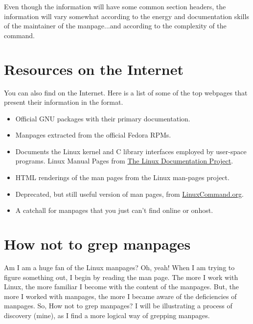 Even though the information will have some common section headers, the information will vary somewhat according to the energy and documentation skills of the maintainer of the manpage...and according to the complexity of the command.\\

\section{Resources on the Internet}

You can also find  on the Internet. Here is a list of some of the top webpages that present their information in the  format.

\begin{itemize}
	\item {}Official GNU packages with their primary documentation.
	\item {}Manpages extracted from the official Fedora RPMs.
	\item {}Documents the Linux kernel and C library interfaces employed by user-space programs. Linux Manual Pages from \href{http://www.tldp.org/manpages/man.html}{The Linux Documentation Project}.
	\item {}HTML renderings of the man pages from the Linux man-pages project.
	\item {} Deprecated, but still useful version of man pages, from \href{http://linuxcommand.org/}{LinuxCommand.org}.
	\item {}  A catchall for manpages that you just can't find online or onhost.	
\end{itemize}

\section{How not to grep manpages}

Am I am a huge fan of the Linux manpages? Oh, yeah! When I am trying to figure something out, I begin by reading the man page. The more I work with Linux, the more familiar I become with the content of the manpages. But, the more I worked with manpages, the more I became aware of the deficiencies of manpages. So, How not to grep manpages? I will be illustrating a process of discovery (mine), as I find a more logical way of grepping manpages.

